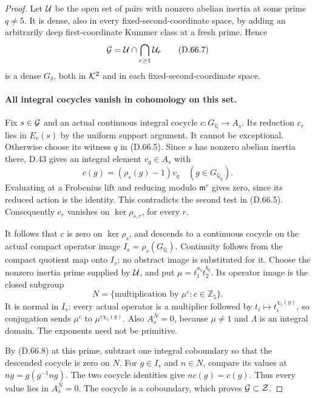 \begin{proof}
Let \({\cal U}\) be the open set of pairs with nonzero
abelian inertia at some prime \(q\ne5\). It is dense,
also in every fixed-second-coordinate space, by adding
an arbitrarily deep first-coordinate Kummer class at a
fresh prime. Hence
\[
            {\cal G}={\cal U}\cap\bigcap_{r\ge1}{\cal U}_r
                                                        \tag{D.66.7}
\]
is a dense \(G_\delta\), both in \({\cal K}^2\) and
in each fixed-second-coordinate space.

\paragraph{All integral cocycles vanish in cohomology on this set.}
Fix \(s\in{\cal G}\) and an actual continuous integral
cocycle \(c:G_{\mathbb Q}\to A_s\). Its reduction
\(c_r\) lies in \(E_r(s)\) by the uniform support
argument. It cannot be exceptional. Otherwise choose its
witness \(q\) in (D.66.5). Since \(s\) has nonzero
abelian inertia there, D.43 gives an integral element
\(v_q\in A_s\) with
\[
             c(g)=(\rho_s(g)-1)v_q
                         \quad(g\in G_{\mathbb Q_q}).
                                                        \tag{D.66.8}
\]
Evaluating at a Frobenius lift and reducing modulo
\(\mathfrak m^r\) gives zero, since its reduced action
is the identity. This contradicts the second test in
(D.66.5). Consequently \(c_r\) vanishes on
\(\ker\rho_{s,r}\), for every \(r\).

It follows that \(c\) is zero on \(\ker\rho_s\),
and descends to a continuous cocycle on the actual compact
operator image \(I_s=\rho_s(G_{\mathbb Q})\).
Continuity follows from the compact quotient map onto
\(I_s\); no abstract image is substituted for it.
Choose the nonzero inertia prime supplied by
\({\cal U}\), and put \(\mu=t_1^{a_q}t_2^{b_q}\).
Its operator image is the closed subgroup
\[
        N=\{\text{multiplication by }\mu^c:c\in\mathbb Z_5\}.
                                                        \tag{D.66.9}
\]
It is normal in \(I_s\): every actual operator is a
multiplier followed by \(t_i\mapsto t_i^{\chi_5(g)}\),
so conjugation sends \(\mu^c\) to
\(\mu^{c\chi_5(g)}\). Also \(A_s^N=0\), because
\(\mu\ne1\) and \(\Lambda\) is an integral domain.
The exponents need not be primitive.

By (D.66.8) at this prime, subtract one integral
coboundary so that the descended cocycle is zero on
\(N\). For \(g\in I_s\) and \(n\in N\), compare
its values at \(ng=g(g^{-1}ng)\). The two cocycle
identities give \(n c(g)=c(g)\). Thus every value
lies in \(A_s^N=0\). The cocycle is a coboundary,
which proves \({\cal G}\subset{\cal Z}\).


\end{proof}
